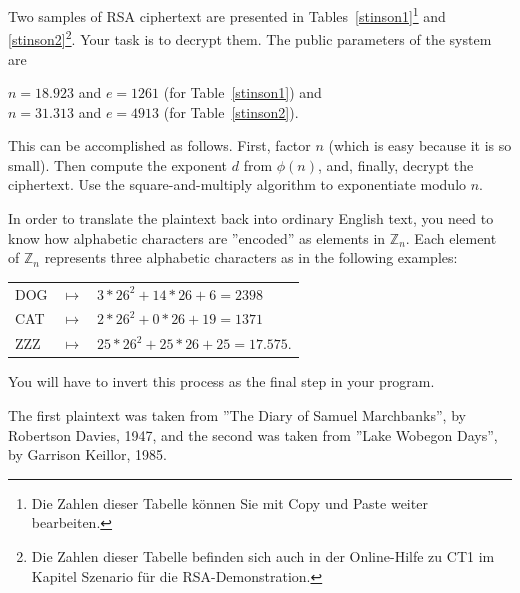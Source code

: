\begin{refsegment}
Two samples of RSA ciphertext are presented in Tables~\ref{stinson1}\footnote{%
Die Zahlen dieser Tabelle können Sie mit Copy und Paste weiter bearbeiten.
}
and \ref{stinson2}\footnote{%
  Die Zahlen dieser Tabelle befinden sich auch in der Online-Hilfe zu
  CT1 im Kapitel \glqq Szenario für die RSA-Demonstration\grqq.
}.
Your task is to decrypt them. The public parameters of the system are

\noindent $n = 18.923$ and $e = 1261$ (for Table~\ref{stinson1}) and\\
\noindent $n = 31.313$ and $e = 4913$ (for Table~\ref{stinson2}).

This can be accomplished as follows. First, factor $n$ (which is easy
because it is so small). Then compute the exponent $d$ from $\phi(n)$, and,
finally, decrypt the ciphertext. Use the square-and-multiply
 algorithm to exponentiate modulo $n$.

In order to translate the plaintext back into ordinary English text, you
need to know how alphabetic characters are ''encoded'' as elements in
$\mathbb{Z}_n$. Each element of $\mathbb{Z}_n$ represents three alphabetic
characters as in the following examples:

{\tt \begin{tabular}{lll}
DOG & $\mapsto$ & $3 * 26^2 + 14 * 26 + 6= 2398$\\
CAT & $\mapsto$ & $2 * 26^2 + 0 * 26 + 19 = 1371$\\
ZZZ & $\mapsto$ & $25 * 26^2 + 25 * 26 + 25 = 17.575$.
\end{tabular} }

You will have to invert this process as the final step in your program.

The first plaintext was taken from ''The Diary of Samuel Marchbanks'', by
Robertson Davies, 1947, and the second was taken from ''Lake Wobegon Days'',
by Garrison Keillor, 1985.


\end{refsegment}
